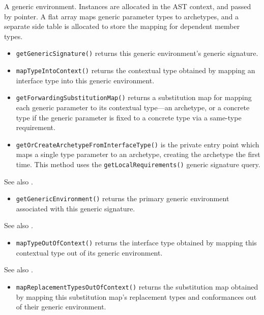 \documentclass[../generics]{subfiles}
\begin{document}
A generic environment. Instances are allocated in the AST context, and passed by pointer. A flat array maps generic parameter types to archetypes, and a separate side table is allocated to store the mapping for dependent member types.
\begin{itemize}
\item \texttt{getGenericSignature()} returns this generic environment's generic signature.
\item \texttt{mapTypeIntoContext()} returns the contextual type obtained by mapping an interface type into this generic environment.
\item \texttt{getForwardingSubstitutionMap()} returns a substitution map for mapping each generic parameter to its contextual type---an archetype, or a concrete type if the generic parameter is fixed to a concrete type via a same-type requirement.

\item \texttt{getOrCreateArchetypeFromInterfaceType()} is the private entry point which maps a single type parameter to an archetype, creating the archetype the first time. This method uses the \texttt{getLocalRequirements()} generic signature query.
\end{itemize}

See also .
\begin{itemize}
\item \texttt{getGenericEnvironment()} returns the primary generic environment associated with this generic signature.
\end{itemize}

See also .
\begin{itemize}
\item \texttt{mapTypeOutOfContext()} returns the interface type obtained by mapping this contextual type out of its generic environment.
\end{itemize}

See also .
\begin{itemize}
\item \texttt{mapReplacementTypesOutOfContext()} returns the substitution map obtained by mapping this substitution map's replacement types and conformances out of their generic environment.
\end{itemize}
\end{document}
